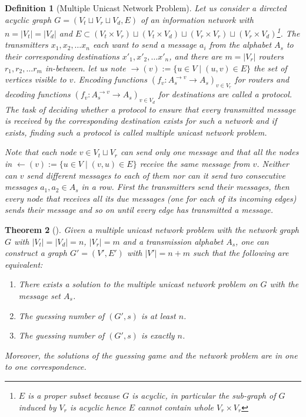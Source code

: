 \documentclass[11pt, a4paper]{kybernetika}
\newtheorem{theorem}{Theorem}[section]
\newtheorem{definition}[theorem]{Definition}
\begin{document}
	\begin{definition}[Multiple Unicast Network Problem]
		Let us consider a directed acyclic graph $G=(V_t\sqcup V_r\sqcup V_d, E)$ of an information network with $n=|V_t|=|V_d|$ and $E\subset(V_t\times V_r)\sqcup(V_t\times V_d)\sqcup(V_r\times V_r)\sqcup(V_r\times V_d)$\footnote{$E$ is a proper subset because $G$ is acyclic, in particular the sub-graph of $G$ induced by $V_r$ is acyclic hence $E$ cannot contain whole $V_r\times V_r$}. The transmitters $x_1,x_2,\ldots x_n$ each want to send a message $a_i$ from the alphabet $A_s$ to their corresponding destinations $x'_1,x'_2,\ldots x'_n$, and there are $m=|V_r|$ routers $r_1,r_2,\ldots r_m$ in-between. let us note $\rightarrow(v):=\{u\in V\mid(u,v)\in E\}$ the set of vertices visible to $v$. Encoding functions $(f_v:A_s^{\rightarrow{v}}\to A_s)_{v\in V_r}$ for routers and decoding functions $(f_v:A_s^{\rightarrow{v}}\to A_s)_{v\in V_d}$ for destinations are called a \emph{protocol}. The task of deciding whether a protocol to ensure that every transmitted message is received by the corresponding destination exists for such a network and if exists, finding such a protocol is called \emph{multiple unicast network problem}.
		
		Note that each node $v\in V_t\sqcup V_r$ can send only one message and that all the nodes in $\leftarrow(v):=\{u\in V\mid(v,u)\in E\}$ receive the same message from $v$. Neither can $v$ send different messages to each of them nor can it send two consecutive messages $a_1,a_2\in A_s$ in a row. First the transmitters send their messages, then every node that receives all its due messages (one for each of its incoming edges) sends their message and so on until every edge has transmitted a message.
	\end{definition}
	
	\begin{theorem}[\cite{riis2006utilising}]\label{thm:hgg-nit-equ}
		Given a multiple unicast network problem with the network graph $G$ with $|V_t|=|V_d|=n$, $|V_r|=m$ and a transmission alphabet $A_s$, one can construct a graph $G'=(V',E')$ with $|V'|=n+m$ such that the following are equivalent:
		\begin{enumerate}
			\item There exists a solution to the multiple unicast network problem on $G$ with the message set $A_s$.
			\item The guessing number of $(G',s)$ is at least $n$.
			\item The guessing number of $(G',s)$ is exactly $n$.
		\end{enumerate}
		Moreover, the solutions of the guessing game and the network problem are in one to one correspondence.
	\end{theorem}
	
\end{document}
